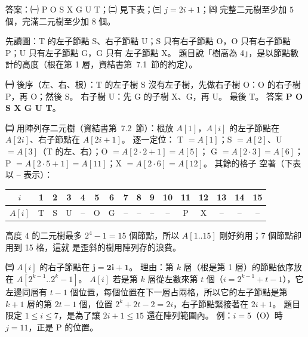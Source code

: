 \begin{pastsoln}
答案：㈠ P O S X G U T；㈡ 見下表；㈢ $j = 2i + 1$；㈣ 完整二元樹至少加 $5$ 個，完滿二元樹至少加
$8$ 個。

先讀圖：T 的左子節點 S、右子節點 U；S 只有右子節點 O，O 只有右子節點 P；U 只有左子節點 G，G 只有
左子節點 X。 題目說「樹高為 4」，是以節點數計的高度（根在第 1 層，資結書第~7.1~節的約定）。

\textbf{㈠} 後序（左、右、根）：T 的左子樹 S 沒有左子樹，先做右子樹 O：O 的右子樹 P，再 O；然後 S。
右子樹 U：先 G 的子樹 X、G，再 U。 最後 T。 答案 \textbf{P O S X G U T}。

\textbf{㈡} 用陣列存二元樹（資結書第~7.2~節）：根放 $A[1]$，$A[i]$ 的左子節點在 $A[2i]$、右子節點在
$A[2i + 1]$。 逐一定位：
T $= A[1]$；S $= A[2]$、U $= A[3]$（T 的左、右）；O $= A[2 \cdot 2 + 1] = A[5]$；
G $= A[2 \cdot 3] = A[6]$；P $= A[2 \cdot 5 + 1] = A[11]$；X $= A[2 \cdot 6] = A[12]$。 其餘的格子
空著（下表以 -- 表示）：
\begin{center}
\small
\setlength{\tabcolsep}{4pt}
\begin{tabular}{c*{15}{c}}
\toprule
$i$ & 1 & 2 & 3 & 4 & 5 & 6 & 7 & 8 & 9 & 10 & 11 & 12 & 13 & 14 & 15 \\
\midrule
$A[i]$ & T & S & U & -- & O & G & -- & -- & -- & -- & P & X & -- & -- & -- \\
\bottomrule
\end{tabular}
\end{center}
高度 $4$ 的二元樹最多 $2^4 - 1 = 15$ 個節點，所以 $A[1..15]$ 剛好夠用；$7$ 個節點卻用到 15 格，這就
是歪斜的樹用陣列存的浪費。

\textbf{㈢} $A[i]$ 的右子節點在 $\mathbf{j = 2i + 1}$。 理由：第 $k$ 層（根是第 1 層）的節點依序放在
$A[2^{k-1} .. 2^k - 1]$。 $A[i]$ 若是第 $k$ 層從左數來第 $t$ 個（$i = 2^{k-1} + t - 1$），它左邊同層有
$t - 1$ 個位置，每個位置在下一層占兩格，所以它的左子節點是第 $k + 1$ 層的第 $2t - 1$ 個，位置
$2^k + 2t - 2 = 2i$，右子節點緊接著在 $2i + 1$。 題目限定 $1 \le i \le 7$，是為了讓 $2i + 1 \le 15$
還在陣列範圍內。 例：$i = 5$（O）時 $j = 11$，正是 P 的位置。


\end{pastsoln}
